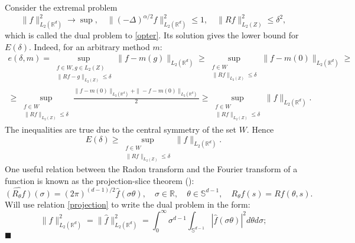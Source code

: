\documentclass[12pt]{iopart}
\newenvironment{proof}
{\par\noindent{\bf Proof}}
{\hfill$\scriptstyle\blacksquare$}
\begin{document}
\begin{proof}
Consider the extremal problem
\[
  \|f\|^2_{L_2(\mathbb R^d)}\to\sup,\quad \|
  (-\Delta)^{\alpha/2}f\|^2_{L_2(\mathbb R^d)}\leqslant  1,\quad
  \|Rf\|^2_{L_2(Z)}\leqslant  \delta^2,
\] which is called the dual problem to \eqref{opter}.
Its solution gives the lower bound for $E(\delta)$. Indeed, for an arbitrary method $m$:
\begin{multline*}
e(\delta,m)= \sup_{
\begin{smallmatrix}
f\in W, g\in L_2(Z)\\ 
\|Rf-g\|_{L_2(Z)}\leqslant \delta
\end{smallmatrix}}
\|f-m(g)\|_{L_2(\mathbb{R}^d)}\geqslant \sup_{
\begin{smallmatrix}
f\in W\\ 
\|Rf\|_{L_2(Z)}\leqslant \delta
\end{smallmatrix}}
\|f-m(0)\|_{L_2(\mathbb{R}^d)}\geqslant \\
\geqslant \sup_{
\begin{smallmatrix}
f\in W\\ 
\|Rf\|_{L_2(Z)}\leqslant \delta
\end{smallmatrix}}
\frac{\|f-m(0)\|_{L_2(\mathbb{R}^d)}+\|-f-m(0)\|_{L_2(\mathbb{R}^d)}}{2}\geqslant \sup_{
\begin{smallmatrix}
f\in W\\ 
\|Rf\|_{L_2(Z)}\leqslant \delta
\end{smallmatrix}}
\|f\|_{L_2(\mathbb{R}^d)}.
\end{multline*}
The inequalities are true due to the central symmetry of the set $W$. Hence
$$E(\delta)\ge\sup_{
\begin{smallmatrix}
f\in W\\ 
\|Rf\|_{L_2(Z)}\leqslant \delta
\end{smallmatrix}}
\|f\|_{L_2(\mathbb{R}^d)}.$$
One useful relation between the Radon transform and the Fourier transform of a function is  known as the projection-slice theorem (\cite{Na}): 
\begin{equation}
\label{projection}
\widehat{(R_\theta f)}(\sigma)=(2\pi)^{(d-1)/2}\widehat f(\sigma\theta),\quad \sigma\in \mathbb R,\quad\theta\in\mathbb S^{d-1}, \quad R_\theta f(s)=Rf(\theta,s).
\end{equation}
Will use relation \eqref{projection} to write the dual problem in the form: 
\[
  \|f\|^2_{L_2(\mathbb R^d)}=\|\widehat{f}\|^2_{L_2(\mathbb R^d)}=\int_0^\infty\sigma^{d-1}\int_{\mathbb S^{d-1}}|\widehat{f}(\sigma\theta )|^2d\theta  d\sigma;
\]
\end{proof}
\end{document}
